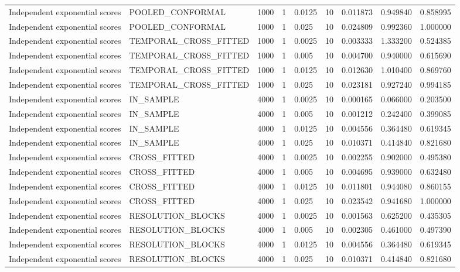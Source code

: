 \begin{tabular}{lllllllll}
Independent exponential scores & POOLED\_CONFORMAL & 1000 & 1 & 0.0125 & 10 & 0.011873 & 0.949840 & 0.858995 \\
Independent exponential scores & POOLED\_CONFORMAL & 1000 & 1 & 0.025 & 10 & 0.024809 & 0.992360 & 1.000000 \\
Independent exponential scores & TEMPORAL\_CROSS\_FITTED & 1000 & 1 & 0.0025 & 10 & 0.003333 & 1.333200 & 0.524385 \\
Independent exponential scores & TEMPORAL\_CROSS\_FITTED & 1000 & 1 & 0.005 & 10 & 0.004700 & 0.940000 & 0.615690 \\
Independent exponential scores & TEMPORAL\_CROSS\_FITTED & 1000 & 1 & 0.0125 & 10 & 0.012630 & 1.010400 & 0.869760 \\
Independent exponential scores & TEMPORAL\_CROSS\_FITTED & 1000 & 1 & 0.025 & 10 & 0.023181 & 0.927240 & 0.994185 \\
Independent exponential scores & IN\_SAMPLE & 4000 & 1 & 0.0025 & 10 & 0.000165 & 0.066000 & 0.203500 \\
Independent exponential scores & IN\_SAMPLE & 4000 & 1 & 0.005 & 10 & 0.001212 & 0.242400 & 0.399085 \\
Independent exponential scores & IN\_SAMPLE & 4000 & 1 & 0.0125 & 10 & 0.004556 & 0.364480 & 0.619345 \\
Independent exponential scores & IN\_SAMPLE & 4000 & 1 & 0.025 & 10 & 0.010371 & 0.414840 & 0.821680 \\
Independent exponential scores & CROSS\_FITTED & 4000 & 1 & 0.0025 & 10 & 0.002255 & 0.902000 & 0.495380 \\
Independent exponential scores & CROSS\_FITTED & 4000 & 1 & 0.005 & 10 & 0.004695 & 0.939000 & 0.632480 \\
Independent exponential scores & CROSS\_FITTED & 4000 & 1 & 0.0125 & 10 & 0.011801 & 0.944080 & 0.860155 \\
Independent exponential scores & CROSS\_FITTED & 4000 & 1 & 0.025 & 10 & 0.023542 & 0.941680 & 1.000000 \\
Independent exponential scores & RESOLUTION\_BLOCKS & 4000 & 1 & 0.0025 & 10 & 0.001563 & 0.625200 & 0.435305 \\
Independent exponential scores & RESOLUTION\_BLOCKS & 4000 & 1 & 0.005 & 10 & 0.002305 & 0.461000 & 0.497390 \\
Independent exponential scores & RESOLUTION\_BLOCKS & 4000 & 1 & 0.0125 & 10 & 0.004556 & 0.364480 & 0.619345 \\
Independent exponential scores & RESOLUTION\_BLOCKS & 4000 & 1 & 0.025 & 10 & 0.010371 & 0.414840 & 0.821680 \\

\end{tabular}
